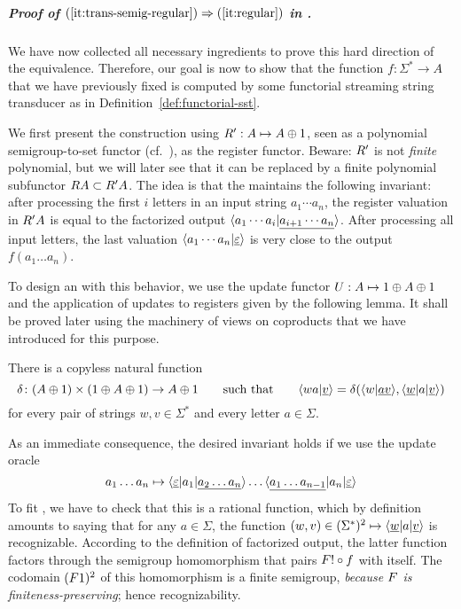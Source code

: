 \subparagraph*{Proof of $(\ref{it:trans-semig-regular}) \Rightarrow (\ref{it:regular})$ in .}
We have now collected all necessary ingredients to prove this hard direction of
the equivalence. Therefore, our goal is now to show that the function $f\colon
\Sigma^* \to A$ that we have previously fixed is computed by some functorial
streaming string transducer as in Definition~\ref{def:functorial-sst}.

We first present the construction using $\functorr' : A \mapsto A \oplus 1$,
seen as a polynomial semigroup-to-set functor
(cf.~), as the register functor.
Beware: $\functorr'$ is not \emph{finite} polynomial, but we will later see that
it can be replaced by a finite polynomial subfunctor $\functorr A \subset
\functorr' A$. The idea is that the \sst maintains the following
invariant: after processing the first $i$ letters in an input string $a_1 \cdots
a_n$, the register valuation in $\functorr' A$ is equal to the factorized output
$\langle a_1 \cdots a_i | \underline{a_{i+1} \cdots a_n} \rangle$. After processing all
input letters, the last valuation $\langle a_1 \cdots a_n | \underline{\varepsilon} \rangle$ is very close to the output $f(a_1\dots a_n)$.

To design an \sst with this behavior, we use the update functor $\functoru : A
\mapsto 1 \oplus A \oplus 1$ and the application of updates to registers given
by the following lemma. It shall be proved later using the machinery of views on
coproducts that we have introduced for this purpose.
\begin{lemma}\label{lem:compute-next-configuration}
  There is a {copyless} natural function
  \[
    \delta\colon (A \oplus 1) \times (1 \oplus A \oplus 1) \to A \oplus 1
    \qquad\text{such that}\qquad
    \langle wa|\underline v \rangle = \delta(\langle w|\underline {av} \rangle,\langle \underline w | a|\underline v \rangle)
  \]
  for every pair of strings $w,v \in \Sigma^*$ and every letter $a \in \Sigma$.
\end{lemma}
As an immediate consequence, the desired invariant holds if we use the update oracle
\[ a_1 \dots a_n \mapsto \langle \underline\varepsilon|a_1|\underline{a_2 \dots a_n} \rangle \dots
  \langle \underline{a_1 \dots a_{n-1}}|a_n|\underline\varepsilon \rangle \]
To fit , we have to check that this is a rational
function, which by definition amounts to saying that for any $a\in\Sigma$, the
function $(w,v) \in (\Sigma^*)^2 \mapsto \langle \underline{w}|a|\underline{v} \rangle$
is recognizable. According to the definition of factorized output, the latter
function factors through the semigroup homomorphism that pairs $\functor! \circ
f$ with itself. The codomain $(\functor1)^2$ of this homomorphism is a finite
semigroup, \emph{because $\functor$ is finiteness-preserving}; hence
recognizability.

